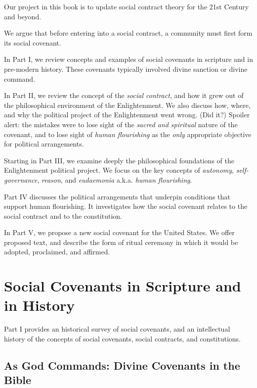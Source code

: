 \documentclass[
]{book}
\begin{document}
Our project in this book is to update social contract theory for the 21st Century and beyond.

We argue that before entering into a social contract, a community must first form its social covenant.

In Part I, we review concepts and examples of social covenants in scripture and in pre-modern history. These covenants typically involved divine sanction or divine command.

In Part II, we review the concept of the \emph{social contract}, and how it grew out of the philosophical environment of the Enlightenment. We also discuss how, where, and why the political project of the Enlightenment went wrong. (Did it?) Spoiler alert: the mistakes were to lose sight of the \emph{sacred and spiritual} nature of the covenant, and to lose sight of \emph{human flourishing} as the \emph{only} appropriate objective for political arrangements.

Starting in Part III, we examine deeply the philosophical foundations of the Enlightenment political project. We focus on the key concepts of \emph{autonomy}, \emph{self-governance}, \emph{reason}, and \emph{eudaemonia} a.k.a. \emph{human flourishing}.

Part IV discusses the political arrangements that underpin conditions that support human flourishing. It investigates how the social covenant relates to the social contract and to the constitution.

In Part V, we propose a new social covenant for the United States. We offer proposed text, and describe the form of ritual ceremony in which it would be adopted, proclaimed, and affirmed.

\hypertarget{part-social-covenants-in-scripture-and-in-history}{%
\part{Social Covenants in Scripture and in History}\label{part-social-covenants-in-scripture-and-in-history}}

Part I provides an historical survey of social covenants, and an intellectual history of the concepts of social covenants, social contracts, and constitutions.

\hypertarget{as-god-commands-divine-covenants-in-the-bible}{%
\chapter{As God Commands: Divine Covenants in the Bible}\label{as-god-commands-divine-covenants-in-the-bible}}
\end{document}
